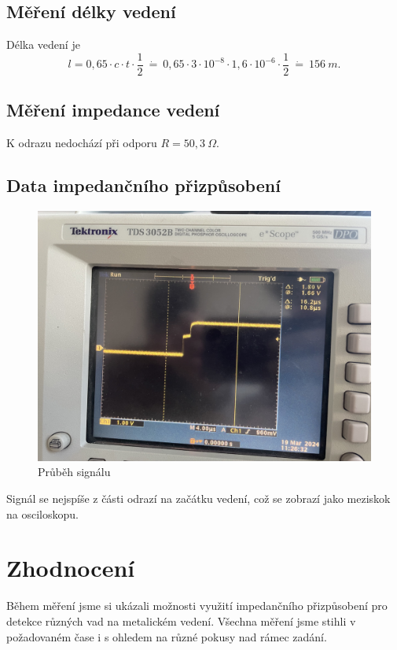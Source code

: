 \subsection{Měření délky vedení}
Délka vedení je \[l = 0,65 \cdot c \cdot t \cdot \frac{1}{2}\ \dot{=}\ 0,65 \cdot 3 \cdot 10^{-8} \cdot 1,6 \cdot 10^{-6} \cdot \frac{1}{2}\  \dot{=}\  156\ m.\]
\subsection{Měření impedance vedení}
K odrazu nedochází při odporu $R = 50,3\ \Omega$.
\newpage
\subsection{Data impedančního přizpůsobení}
\begin{figure}[h]
\centering
\includegraphics[width=13cm]{images/obr_4.jpg}
\caption{Průběh signálu}
\label{fig:6}
\end{figure}
Signál se nejspíše z části odrazí na začátku vedení, což se zobrazí jako meziskok na osciloskopu.
\section{Zhodnocení}
Během měření jsme si ukázali možnosti využití impedančního přizpůsobení pro detekce různých vad na metalickém vedení. Všechna měření jsme stihli v požadovaném čase i s ohledem na různé pokusy nad rámec zadání.
